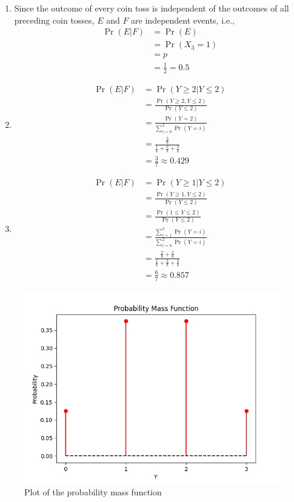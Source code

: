 \documentclass[journal,12pt,twocolumn]{IEEEtran}
\providecommand{\pr}[1]{\ensuremath{\Pr\left(#1\right)}}
\begin{document}
	\begin{enumerate}[label=(\roman*)]
	\item Since the outcome of every coin toss is independent of the outcomes of all preceding coin tosses, $E$ and $F$ are independent events, i.e.,
	\begin{align}
		\pr{E|F} &= \pr{E} \\
		&= \pr{X_3 = 1} \\
		&= p \\
		&= \frac12 = 0.5
	\end{align}
	
	\item
	\begin{align}
		\pr{E|F} &= \pr{Y \ge 2 | Y \le 2} \\
		&= \frac{\pr{Y \ge 2 , Y \le 2}}{\pr{Y \le 2}} \\
		&= \frac{\pr{Y = 2}}{\sum_{i=0}^2 \pr{Y = i}} \\
		&= \frac{\frac38}{\frac18 + \frac38 + \frac38} \\
		&= \frac37 \approx 0.429
	\end{align}
	
	\item
	\begin{align}
		\pr{E|F} &= \pr{Y \ge 1 | Y \le 2} \\
		&= \frac{\pr{Y \ge 1 , Y \le 2}}{\pr{Y \le 2}} \\
		&= \frac{\pr{1 \le Y \le 2}}{\pr{Y \le 2}} \\
		&= \frac{\sum_{i=1}^2 \pr{Y = i}}{\sum_{i=0}^2 \pr{Y = i}} \\
		&= \frac{\frac38 + \frac38}{\frac18 + \frac38 + \frac38} \\
		&= \frac67 \approx 0.857
	\end{align}
	\end{enumerate}	
	
	\begin{figure}[!ht]
		\centering
		\includegraphics[width=\columnwidth]{figs/fig-1.png}
		\caption{Plot of the probability mass function}
		\label{fig1}
	\end{figure}
	
\end{document}
